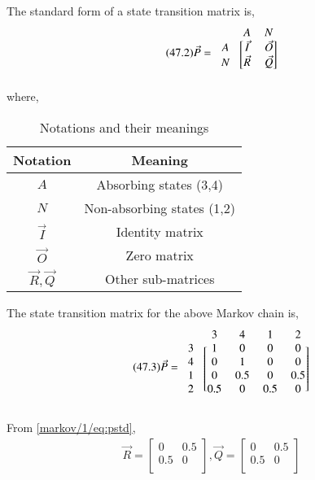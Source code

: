 \newpage
\begin{definition}
The standard form of a state transition matrix is,
\begin{align}
\tag{47.2}
\label{markov/1/eq:std}
   \vec{P}=\begin{blockarray}{ccc}
&A & N \\
\begin{block}{c[cc]}
  A & \vec{I} & \vec{O}  \\
  N & \vec{R} & \vec{Q} \\
\end{block}
\end{blockarray}
\end{align}
where,
\begin{table}[h!]
\centering
\caption{Notations and their meanings}
\label{markov/1/table:3}
\begin{tabular}{|c|c|}
    \hline
    Notation & Meaning \\
    \hline
    $A$ & Absorbing states (3,4)\\[1ex]
    \hline
    $N$ & Non-absorbing states (1,2)\\[1ex]
    \hline
    $\vec{I}$ & Identity matrix\\[1ex]
    \hline
    $\vec{O}$ & Zero matrix\\[1ex]
    \hline
    $\vec{R},\vec{Q}$ & Other sub-matrices\\[1ex]
    \hline
\end{tabular}
\end{table}
\end{definition}
\begin{corollary}
The state transition matrix for the above Markov chain is, 
\begin{align}
\tag{47.3}
\label{markov/1/eq:pstd}
    \vec{P}=\begin{blockarray}{cccccc}
& 3 & 4 & 1 & 2 \\
\begin{block}{c[ccccc]}
  3 & 1 & 0 & 0 & 0 \\
  4 & 0 & 1 & 0 & 0 \\
  1 & 0 & 0.5 & 0 & 0.5  \\
  2 & 0.5 & 0 & 0.5 & 0  \\
\end{block}
\end{blockarray}
\end{align}
\end{corollary}
From \eqref{markov/1/eq:pstd},
\begin{align}
\tag{47.4}
\label{markov/1/eq:r,q}
    \vec{R}=\begin{bmatrix}
    0 & 0.5\\
    0.5 & 0\\
    \end{bmatrix},
    \vec{Q}=\begin{bmatrix}
    0 & 0.5 \\
    0.5 & 0 \\
    \end{bmatrix}
\end{align}
